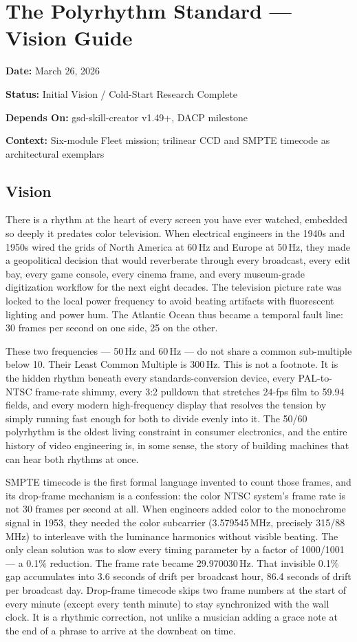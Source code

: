 \documentclass[11pt,letterpaper]{article}
\newcommand{\metafield}[2]{\textbf{\sffamily #1} #2\par}
\begin{document}
\section{The Polyrhythm Standard --- Vision Guide}

\metafield{Date:}{March 26, 2026}
\metafield{Status:}{Initial Vision / Cold-Start Research Complete}
\metafield{Depends On:}{gsd-skill-creator v1.49+, DACP milestone}
\metafield{Context:}{Six-module Fleet mission; trilinear CCD and SMPTE timecode as architectural exemplars}

\subsection{Vision}

There is a rhythm at the heart of every screen you have ever watched, embedded so deeply it predates color
television. When electrical engineers in the 1940s and 1950s wired the grids of North America at
60\,Hz and Europe at 50\,Hz, they made a geopolitical decision that would reverberate through every
broadcast, every edit bay, every game console, every cinema frame, and every museum-grade digitization
workflow for the next eight decades. The television picture rate was locked to the local power frequency
to avoid beating artifacts with fluorescent lighting and power hum. The Atlantic Ocean thus became a
temporal fault line: 30 frames per second on one side, 25 on the other.

These two frequencies --- 50\,Hz and 60\,Hz --- do not share a common sub-multiple below 10. Their
Least Common Multiple is 300\,Hz. This is not a footnote. It is the hidden rhythm beneath every
standards-conversion device, every PAL-to-NTSC frame-rate shimmy, every 3:2 pulldown that stretches
24-fps film to 59.94 fields, and every modern high-frequency display that resolves the tension by
simply running fast enough for both to divide evenly into it. The 50/60 polyrhythm is the oldest
living constraint in consumer electronics, and the entire history of video engineering is, in some
sense, the story of building machines that can hear both rhythms at once.

SMPTE timecode is the first formal language invented to count those frames, and its drop-frame
mechanism is a confession: the color NTSC system's frame rate is not 30 frames per second at all.
When engineers added color to the monochrome signal in 1953, they needed the color subcarrier
(3.579545\,MHz, precisely 315/88\,MHz) to interleave with the luminance harmonics without visible
beating. The only clean solution was to slow every timing parameter by a factor of 1000/1001 --- a
0.1\% reduction. The frame rate became 29.970030\,Hz. That invisible 0.1\% gap accumulates into 3.6
seconds of drift per broadcast hour, 86.4 seconds of drift per broadcast day. Drop-frame timecode
skips two frame numbers at the start of every minute (except every tenth minute) to stay synchronized
with the wall clock. It is a rhythmic correction, not unlike a musician adding a grace note at the
end of a phrase to arrive at the downbeat on time.
\end{document}
